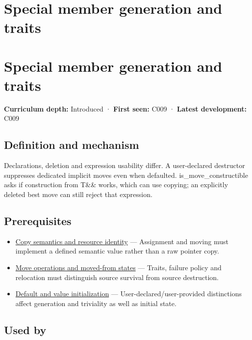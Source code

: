 \hypertarget{appendix-42e02a12c694}{}
\section*{Special member generation and traits}
\section{Special member generation and traits}\label{appendix-42e02a12c694-special-member-generation-and-traits}

\textbf{Curriculum depth:} Introduced · \textbf{First seen:} C009 · \textbf{Latest development:} C009

\subsection{Definition and mechanism}\label{appendix-42e02a12c694-definition-and-mechanism}

Declarations, deletion and expression usability differ. A user-declared destructor suppresses dedicated implicit moves even when defaulted. is\_move\_constructible asks if construction from T\&\& works, which can use copying; an explicitly deleted best move can still reject that expression.

\subsection{Prerequisites}\label{appendix-42e02a12c694-prerequisites}

\begin{itemize}
\tightlist
\item
  \hyperref[appendix-1340cd1ce582]{Copy semantics and resource identity} --- Assignment and moving must implement a defined semantic value rather than a raw pointer copy.
\item
  \hyperref[appendix-5636651017c2]{Move operations and moved-from states} --- Traits, failure policy and relocation must distinguish source survival from source destruction.
\item
  \hyperref[appendix-ba8c1a9fe03f]{Default and value initialization} --- User-declared/user-provided distinctions affect generation and triviality as well as initial state.
\end{itemize}

\subsection{Used by}\label{appendix-42e02a12c694-used-by}

